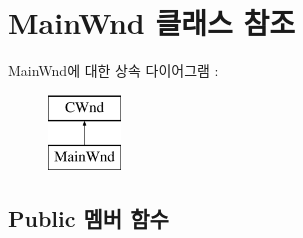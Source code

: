 \hypertarget{class_main_wnd}{}\section{Main\+Wnd 클래스 참조}
\label{class_main_wnd}
Main\+Wnd에 대한 상속 다이어그램 \+: \begin{figure}[H]
\begin{center}
\leavevmode
\includegraphics[height=2.000000cm]{class_main_wnd}
\end{center}
\end{figure}
\subsection*{Public 멤버 함수}
